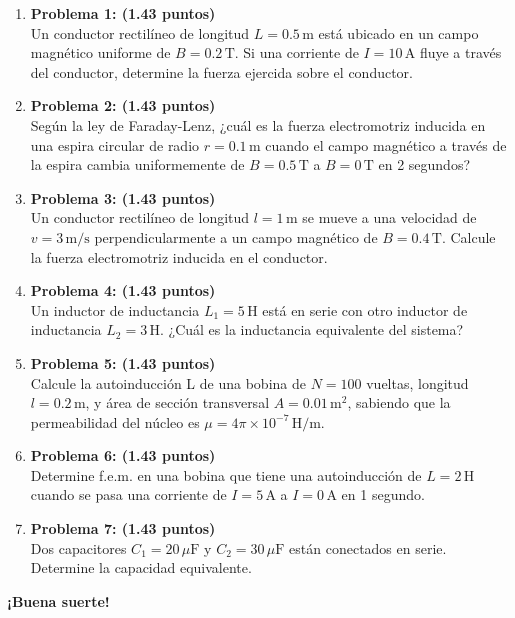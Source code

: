 \documentclass[a4paper,12pt]{article}
\begin{document}
\begin{enumerate}
    \item \textbf{Problema 1: (1.43 puntos)} \\
    Un conductor rectilíneo de longitud \(L = 0.5 \, \text{m}\) está ubicado en un campo magnético uniforme de \(B = 0.2 \, \text{T}\). Si una corriente de \(I = 10 \, \text{A}\) fluye a través del conductor, determine la fuerza ejercida sobre el conductor.
    
    \item \textbf{Problema 2: (1.43 puntos)} \\
    Según la ley de Faraday-Lenz, ¿cuál es la fuerza electromotriz inducida en una espira circular de radio \(r = 0.1 \, \text{m}\) cuando el campo magnético a través de la espira cambia uniformemente de \(B = 0.5 \, \text{T}\) a \(B = 0 \, \text{T}\) en 2 segundos?
    
    \item \textbf{Problema 3: (1.43 puntos)} \\
    Un conductor rectilíneo de longitud \(l = 1 \, \text{m}\) se mueve a una velocidad de \(v = 3 \, \text{m/s}\) perpendicularmente a un campo magnético de \(B = 0.4 \, \text{T}\). Calcule la fuerza electromotriz inducida en el conductor.
    
    \item \textbf{Problema 4: (1.43 puntos)} \\
    Un inductor de inductancia \(L_1 = 5 \, \text{H}\) está en serie con otro inductor de inductancia \(L_2 = 3 \, \text{H}\). ¿Cuál es la inductancia equivalente del sistema?
    
    \item \textbf{Problema 5: (1.43 puntos)} \\
    Calcule la autoinducción L de una bobina de \(N = 100\) vueltas, longitud \(l = 0.2 \, \text{m}\), y área de sección transversal \(A = 0.01 \, \text{m}^2\), sabiendo que la permeabilidad del núcleo es \(\mu = 4 \pi \times 10^{-7} \, \text{H/m}\).
    
    \item \textbf{Problema 6: (1.43 puntos)} \\
    Determine f.e.m. en una bobina que tiene una autoinducción de \(L = 2 \, \text{H}\) cuando se pasa una corriente de \(I = 5 \, \text{A}\) a \(I = 0 \, \text{A}\) en 1 segundo.
    
    \item \textbf{Problema 7: (1.43 puntos)} \\
    Dos capacitores \(C_1 = 20 \, \mu\text{F}\) y \(C_2 = 30 \, \mu\text{F}\) están conectados en serie. Determine la capacidad equivalente.
\end{enumerate}

\vfill
\begin{center}
    \textbf{¡Buena suerte!}
\end{center}
\end{document}
